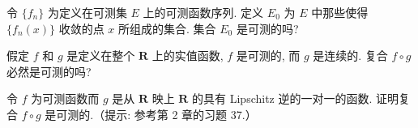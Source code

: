 \documentclass[../../main.tex]{subfiles}
\begin{document}
\begin{exercise}\label{exercise:ch03-09}
令 $\{f_{n}\}$ 为定义在可测集 $E$ 上的可测函数序列. 定义 $E_{0}$ 为 $E$ 中那些使得 $\{f_{n}(x)\}$ 收敛的点 $x$ 所组成的集合. 集合 $E_{0}$ 是可测的吗?
\end{exercise}

\begin{exercise}\label{exercise:ch03-10}
假定 $f$ 和 $g$ 是定义在整个 $\mathbf{R}$ 上的实值函数, $f$ 是可测的, 而 $g$ 是连续的. 复合 $f\circ g$ 必然是可测的吗?
\end{exercise}

\begin{exercise}\label{exercise:ch03-11}
令 $f$ 为可测函数而 $g$ 是从 $\mathbf{R}$ 映上 $\mathbf{R}$ 的具有 Lipschitz 逆的一对一的函数. 证明复合 $f\circ g$ 是可测的.（提示: 参考第 2 章的习题 37.）
\end{exercise}
\end{document}
